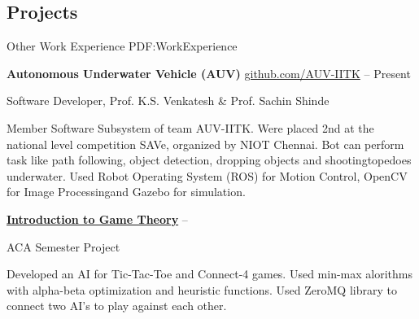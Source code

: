 \documentclass[letterpaper,10pt,oneside]{article}
\begin{document}
\begin{body}





\section
{Projects}
{Other Work Experience}
{PDF:WorkExperience}

{\textbf{Autonomous Underwater Vehicle (AUV)}}
\href{https://github.com/AUV-IITK}
{github.com/AUV-IITK}
\hfill
{} --
Present

\GapNoBreak
\BulletItem
Software Developer,
Prof. K.S. Venkatesh \& Prof. Sachin Shinde
\begin{detail}
\SubBulletItem
Member Software Subsystem of team AUV-IITK.
\SubBulletItem
Were placed 2nd at the national level competition SAVe, organized by NIOT Chennai.
\SubBulletItem
Bot can perform task like path following, object detection, dropping objects and shooting\newline topedoes underwater.
\SubBulletItem
Used Robot Operating System (ROS) for Motion Control, OpenCV for Image Processing\newline and Gazebo for simulation.
\end{detail}


\href{https://github.com/pkhrag/ACA-Project-Game-Theory}
{\textbf{Introduction to Game Theory}}
\hfill
{} --

\GapNoBreak
\BulletItem
ACA Semester Project
\begin{detail}
\SubBulletItem
Developed an AI for Tic-Tac-Toe and Connect-4 games.
\SubBulletItem
Used min-max alorithms with alpha-beta optimization and heuristic functions.
\SubBulletItem
Used ZeroMQ library to connect two AI's to play against each other.
\end{detail}


\end{body}
\end{document}
